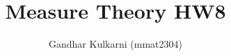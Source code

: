 \documentclass{article}
\title{Measure Theory HW8} %
\author{Gandhar Kulkarni (mmat2304)} %
\date{} %
\begin{document}
\maketitle %


\section{} %
\section{} %
\section{} %
\section{} %
\section{} %
\section{} %
\section{} %
\section{} %
\section{} %
\section{} %
\section{} %
\section{} %
\section{} %
\end{document}
